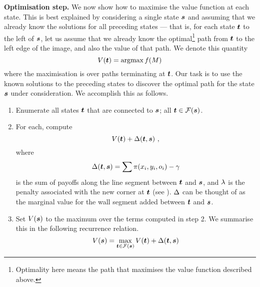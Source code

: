 \textbf{Optimisation step.} We now show how to maximise the value
function at each state. This is best explained by considering a single
state $\State$ and assuming that we already know the solutions for all
preceding states --- that is, for each state $\OtherState$ to
the left of $\State$, let us assume that we already know the
optimal\footnote{Optimality here means the path that maximises the
  value function described above.}
path from $\OtherState$ to the left edge of the image, and also the
value of that path. We denote this quantity
\begin{equation}
  \label{eq:bestvalue-def}
  \bestvalue(\OtherState) = \argmax \Objective(\Scene)
\end{equation}
where the maximisation is over paths terminating at $\OtherState$. Our
task is to use the known solutions to the preceding states to
discover the optimal path for the state $\State$ under
consideration. We accomplish this as follows.
\begin{enumerate}
  \item{Enumerate all states $\OtherState$ that are connected to
    $\State$; \ie all $\OtherState\in\FeasibleSet(\State)$.
  }
  \item{For each, compute
    \begin{equation}
      \label{eq:optimisation-step}
      \bestvalue(\OtherState)+\edgevalue(\OtherState,\State) ~,
    \end{equation}
    where
    \begin{equation}
      \label{eq:edge-value-basic}
      \edgevalue(\OtherState,\State) =
        \sum \PixelPayoff(x_i,y_i,\WallOrient_i) - \CornerPenalty
    \end{equation}
    is the sum of payoffs along the line segment between
    $\OtherState$ and $\State$, and $\Penalty$ is the penalty
    associated with the new corner at $\OtherState$ (see
    ). $\edgevalue$ can be thought of as the
    marginal value for the wall segment added between $\OtherState$
    and $\State$.
  }
  \item{Set $\bestvalue(\State)$ to the maximum over the terms
    computed in step 2. We summarise this in the following recurrence
    relation.
    \begin{equation}
      \bestvalue(\State) = 
      \max_{\OtherState \in \FeasibleSet(\State)}\limits
      \bestvalue(\OtherState) + \edgevalue(\OtherState,\State)
    \end{equation}
  }
\end{enumerate}

